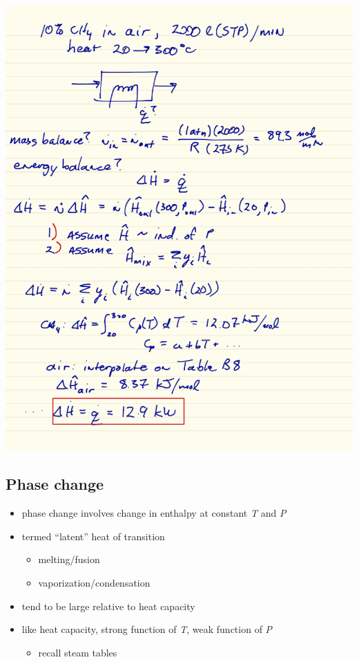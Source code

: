 \documentclass[11pt]{article}
\begin{document}
\includegraphics[width=.9\linewidth]{./figs/gasheat.png}

\subsection{Phase change}
\label{sec-10-5}
\begin{itemize}
\item phase change involves change in enthalpy at constant \emph{T} and \emph{P}
\item termed ``latent'' heat of transition
\begin{itemize}
\item melting/fusion
\item vaporization/condensation
\end{itemize}
\item tend to be large relative to heat capacity
\item like heat capacity, strong function of \emph{T}, weak function of \emph{P}
\begin{itemize}
\item recall steam tables
\end{itemize}
\end{itemize}
\end{document}
